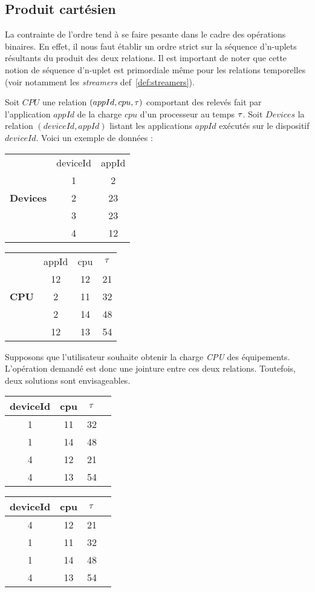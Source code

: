\subsection{Produit cartésien}
La contrainte de l'ordre tend à se faire pesante dans le cadre des opérations binaires. En effet, il nous faut établir un ordre strict sur la séquence d'n-uplets résultants du produit des deux relations. Il est important de noter que cette notion de séquence d'n-uplet est primordiale même pour les relations temporelles (voir notamment les \textit{streamers} def~\ref{def:streamers}).
\begin{example}\label{ex:asymetrie}
Soit $CPU$ une relation $(appId, cpu, \tau)$ comportant des relevés fait par l'application $appId$ de la charge $cpu$ d'un processeur au temps $\tau$. Soit $Devices$ la relation $(deviceId, appId)$ listant les applications $appId$ exécutés sur le dispositif $deviceId$. Voici un exemple de données :
\begin{center}
\begin{tabular}{ccc}
& deviceId & appId \\ %
\cline{2-3} & 1 & 2 \\
\textbf{Devices} &2 & 23 \\
&3 & 23 \\
&4 & 12 \\
\end{tabular} \quad \quad \quad
\begin{tabular}{cccc}
& appId & cpu & $\tau$ \\%
\cline{2-4} & 12 & 12 & 21 \\
\textbf{CPU}& 2 & 11 & 32 \\
& 2 & 14 & 48 \\
&12& 13 & 54 \\
\end{tabular}
\end{center}

Supposons que l'utilisateur souhaite obtenir la charge \textit{CPU} des équipements. L'opération demandé est donc une jointure entre ces deux relations. Toutefois, deux solutions sont envisageables.
\begin{center}
\begin{tabular}{cccc} 
        deviceId & cpu & $\tau$ \\ \hline 
        1&  11&  32  \\
        1&  14&  48  \\
        4&  12&  21 \\
        4&  13&  54\\
\end{tabular}
\quad \quad \quad
\begin{tabular}{cccc}
        deviceId & cpu & $\tau$ \\ \hline 
        4&  12&  21\\
        1&  11&  32\\
        1&  14&  48\\
        4&  13&  54\\
\end{tabular}
\end{center}


\end{example}

